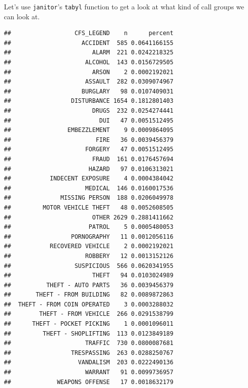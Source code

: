 \documentclass[]{book}
\newenvironment{Shaded}{\begin{snugshade}}{\end{snugshade}}
\newcommand{\KeywordTok}[1]{\textcolor[rgb]{0.13,0.29,0.53}{\textbf{#1}}}
\newcommand{\NormalTok}[1]{#1}
\newcommand{\OperatorTok}[1]{\textcolor[rgb]{0.81,0.36,0.00}{\textbf{#1}}}
\newcommand{\StringTok}[1]{\textcolor[rgb]{0.31,0.60,0.02}{#1}}
\begin{document}
Let's use \texttt{janitor}'s \texttt{tabyl} function to get a look at what kind of call groups we can look at.

\begin{Shaded}
\end{Shaded}

\begin{verbatim}
##                  CFS_LEGEND    n      percent
##                    ACCIDENT  585 0.0641166155
##                       ALARM  221 0.0242218325
##                     ALCOHOL  143 0.0156729505
##                       ARSON    2 0.0002192021
##                     ASSAULT  282 0.0309074967
##                    BURGLARY   98 0.0107409031
##                 DISTURBANCE 1654 0.1812801403
##                       DRUGS  232 0.0254274441
##                         DUI   47 0.0051512495
##                EMBEZZLEMENT    9 0.0009864095
##                        FIRE   36 0.0039456379
##                     FORGERY   47 0.0051512495
##                       FRAUD  161 0.0176457694
##                      HAZARD   97 0.0106313021
##           INDECENT EXPOSURE    4 0.0004384042
##                     MEDICAL  146 0.0160017536
##              MISSING PERSON  188 0.0206049978
##         MOTOR VEHICLE THEFT   48 0.0052608505
##                       OTHER 2629 0.2881411662
##                      PATROL    5 0.0005480053
##                 PORNOGRAPHY   11 0.0012056116
##           RECOVERED VEHICLE    2 0.0002192021
##                     ROBBERY   12 0.0013152126
##                  SUSPICIOUS  566 0.0620341955
##                       THEFT   94 0.0103024989
##          THEFT - AUTO PARTS   36 0.0039456379
##       THEFT - FROM BUILDING   82 0.0089872863
##  THEFT - FROM COIN OPERATED    3 0.0003288032
##        THEFT - FROM VEHICLE  266 0.0291538799
##      THEFT - POCKET PICKING    1 0.0001096011
##         THEFT - SHOPLIFTING  113 0.0123849189
##                     TRAFFIC  730 0.0800087681
##                 TRESPASSING  263 0.0288250767
##                   VANDALISM  203 0.0222490136
##                     WARRANT   91 0.0099736957
##             WEAPONS OFFENSE   17 0.0018632179
\end{verbatim}
\end{document}
